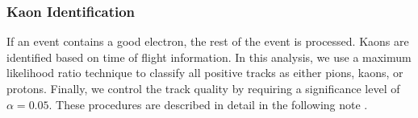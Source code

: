 \subsubsection{Kaon Identification}
If an event contains a good electron, the rest of the event is processed.  Kaons are identified based on time of flight information.  In this analysis, we use a maximum likelihood ratio technique to classify all positive tracks as either pions, kaons, or protons.  Finally, we control the track quality by requiring a significance level of $\alpha = 0.05$.  These procedures are described in detail in the following note \cite{kaon-note}.

